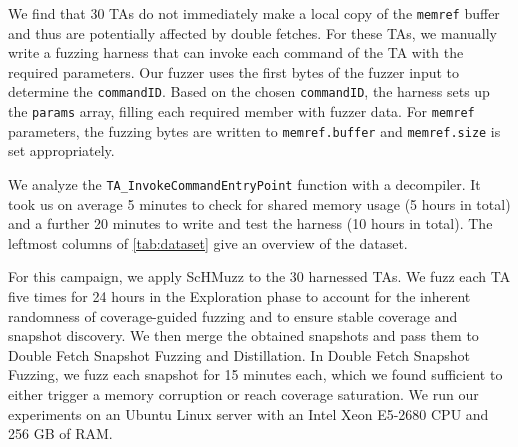 \documentclass[conference]{IEEEtran}
\newcommand{\sysname}{ScHMuzz\xspace}
\newcommand{\stageone}{Exploration\xspace}
\newcommand{\stagetwo}{Double Fetch Snapshot Fuzzing\xspace}
\newcommand{\stagethree}{Distillation\xspace}
\newcommand{\numTAsharnessed}{30\xspace}
\newcommand{\numruns}{five\xspace}
\begin{document}
We find that \numTAsharnessed TAs do not immediately make a local copy of the \texttt{memref} buffer 
and thus are potentially affected by double fetches. For these TAs, we manually write a fuzzing harness
that can invoke each command of the TA with the required parameters.
Our fuzzer uses the first bytes of the fuzzer input to determine the \texttt{commandID}. 
Based on the chosen \texttt{commandID}, the harness sets up the \texttt{params} array, 
filling each required member with fuzzer data. For \texttt{memref} parameters, the fuzzing 
bytes are written to \texttt{memref.buffer} and \texttt{memref.size} is set appropriately.



We analyze the \texttt{TA\_InvokeCommandEntryPoint} function with a decompiler. It took us on average 
5 minutes to check for shared memory usage (5 hours in total) and a further 20 minutes to write and test the harness (10 hours in total). The leftmost columns of \autoref{tab:dataset} give an overview of the dataset.

For this campaign, we apply \sysname to the \numTAsharnessed harnessed TAs. We fuzz each TA \numruns 
times for 24 hours in the \stageone phase to account for the inherent randomness of coverage-guided 
fuzzing and to ensure stable coverage and snapshot discovery. 
We then merge the obtained snapshots and pass them to 
\stagetwo and \stagethree. In \stagetwo, we fuzz each snapshot for 15 minutes each, 
which we found sufficient to either trigger a memory corruption or reach coverage saturation.
We run our experiments on an Ubuntu Linux server with an Intel Xeon E5-2680 CPU and 256 GB of RAM.
\end{document}

